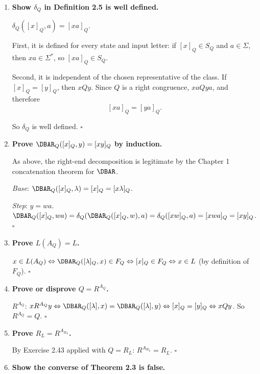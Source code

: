 \begin{enumerate}[{2.}1.]
\item \textbf{Show $\delta_Q$ in Definition 2.5 is well defined.}

$\delta_Q([x]_Q,a)=[xa]_Q$.

First, it is defined for every state and input letter: if $[x]_Q\in S_Q$ and $a\in\Sigma$, then $xa\in\Sigma^*$, so $[xa]_Q\in S_Q$.

Second, it is independent of the chosen representative of the class. If $[x]_Q=[y]_Q$, then $x Q y$. Since $Q$ is a right congruence, $xa Q ya$, and therefore
\[
[xa]_Q=[ya]_Q.
\]

So $\delta_Q$ is well defined. $\square$

\item \textbf{Prove $\DBAR_Q([x]_Q,y)=[xy]_Q$ by induction.}

As above, the right-end decomposition is legitimate by the Chapter 1
concatenation theorem for $\DBAR$.

\textit{Base}: $\DBAR_Q([x]_Q,\lambda)=[x]_Q=[x\lambda]_Q$. \checkmark

\textit{Step}: $y=wa$. $\DBAR_Q([x]_Q,wa)=\delta_Q(\DBAR_Q([x]_Q,w),a)=\delta_Q([xw]_Q,a)=[xwa]_Q=[xy]_Q$. $\square$

\item \textbf{Prove $L(A_Q)=L$.}

$x\in L(A_Q)\Leftrightarrow\DBAR_Q([\lambda]_Q,x)\in F_Q\Leftrightarrow[x]_Q\in F_Q\Leftrightarrow x\in L$ (by definition of $F_Q$). $\square$

\item \textbf{Prove or disprove $Q=R^{A_Q}$.}

$R^{A_Q}$: $x R^{A_Q} y\Leftrightarrow\DBAR_Q([\lambda],x)=\DBAR_Q([\lambda],y)\Leftrightarrow[x]_Q=[y]_Q\Leftrightarrow x Q y$. So $R^{A_Q}=Q$. $\square$

\item \textbf{Prove $R_L=R^{A_{R_L}}$.}

By Exercise 2.43 applied with $Q=R_L$: $R^{A_{R_L}}=R_L$. $\square$

\item \textbf{Show the converse of Theorem 2.3 is false.}


\end{enumerate}
